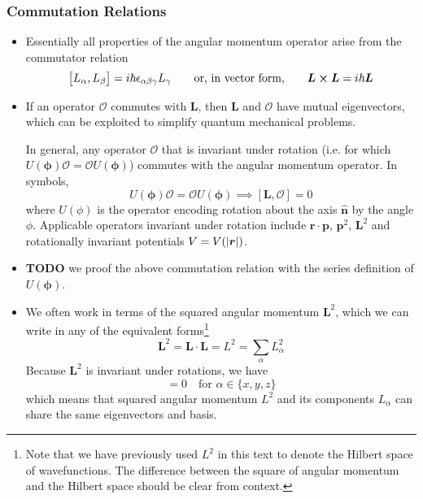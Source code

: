 \documentclass[11pt, a4paper]{article}
\newcommand{\eqtext}[1]{\qquad \text{#1} \qquad}
\renewcommand{\vec}[1]{\bm{#1}}  %
\newcommand{\uvec}[1]{\hat{\vec{#1}}}  %
\renewcommand{\r}{\vec{r}}  %
\renewcommand{\L}{\vec{L}}  %
\renewcommand{\O}{\mathcal{O}}  %
\begin{document}
\subsubsection{Commutation Relations}
\begin{itemize}
	\item Essentially all properties of the angular momentum operator arise from the commutator relation
	\begin{equation*}
		\big[L_{\alpha}, L_{\beta}\big] = i \hbar \epsilon_{\alpha \beta \gamma}L_{\gamma} \eqtext{or, in vector form,} \L \cross \L = i \hbar \L
	\end{equation*}
	
	\item If an operator $ \O $ commutes with $ \L $, then $ \L $ and $ \O $ have mutual eigenvectors, which can be exploited to simplify quantum mechanical problems.  
	
	In general, any operator $ \O $ that is invariant under rotation (i.e. for which $ U(\vec{\phi})\O = \O U(\vec{\phi})  $) commutes with the angular momentum operator. In symbols,
	\begin{equation*}
		U(\vec{\phi})\O = \O U(\vec{\phi})  \implies [\L, \O] = 0
	\end{equation*}
	where $ U(\phi) $ is the operator encoding rotation about the axis $ \uvec{n} $ by the angle $ \phi $. Applicable operators invariant under rotation include $ \r \cdot \vec{p} $, $ \vec{p}^{2} $, $ \L^{2} $ and rotationally invariant potentials $ V = V(\abs{\r}) $. 
	
	\item \textbf{TODO} we proof the above commutation relation with the series definition of $ U(\vec{\phi}) $. 
	
	\item We often work in terms of the squared angular momentum $ \L^{2} $, which we can write in any of the equivalent forms\footnote{Note that we have previously used $ L^{2} $ in this text to denote the Hilbert space of wavefunctions. The difference between the square of angular momentum and the Hilbert space should be clear from context.}
	\begin{equation*}
		\L^{2} = \L \cdot \L = L^{2} = \sum_{\alpha} L_{\alpha}^{2}
	\end{equation*}
	Because $ \L^{2} $ is invariant under rotations, we have
	\begin{equation*}
		[L_{\alpha}, L^{2}] = 0 \quad \text{for } \alpha \in \{x, y, z\}
	\end{equation*}
	which means that squared angular momentum $ L^{2} $ and its components $ L_{\alpha} $ can share the same eigenvectors and basis.
	
\end{itemize}
\end{document}
